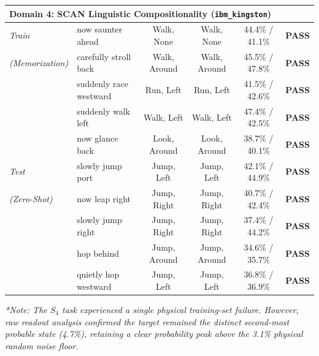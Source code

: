 \documentclass[11pt, a4paper]{article}
\begin{document}
\begin{table}[tb!]
{\begin{tabular}{llcccc}
\midrule
\multicolumn{6}{l}{\textbf{Domain 4: SCAN Linguistic Compositionality (\texttt{ibm\_kingston})}} \\
\midrule
\textit{Train}
& now saunter ahead      & Walk, None   & Walk, None   & 44.4\% / 41.1\% & \textbf{PASS} \\
\textit{(Memorization)} & carefully stroll back  & Walk, Around & Walk, Around & 45.5\% / 47.8\% & \textbf{PASS} \\
& suddenly race westward & Run, Left    & Run, Left    & 41.5\% / 42.6\% & \textbf{PASS} \\
& suddenly walk left     & Walk, Left   & Walk, Left   & 47.4\% / 42.5\% & \textbf{PASS} \\
& now glance back        & Look, Around & Look, Around & 38.7\% / 40.1\% & \textbf{PASS} \\
\midrule
\textit{Test}
& slowly jump port       & Jump, Left   & Jump, Left   & 42.1\% / 44.9\% & \textbf{PASS} \\
\textit{(Zero-Shot)} & now leap right         & Jump, Right  & Jump, Right  & 40.7\% / 42.4\% & \textbf{PASS} \\
& slowly jump right      & Jump, Right  & Jump, Right  & 37.4\% / 44.2\% & \textbf{PASS} \\
& hop behind             & Jump, Around & Jump, Around & 34.6\% / 35.7\% & \textbf{PASS} \\
& quietly hop westward   & Jump, Left   & Jump, Left   & 36.8\% / 36.9\% & \textbf{PASS} \\
\bottomrule
\end{tabular}
}

\vspace{0.15cm}
\parbox{0.97\textwidth}{\scriptsize \textit{*Note: The $S_4$ task experienced a single physical training-set failure. However, raw readout analysis confirmed the target remained the distinct second-most probable state (4.7\%), retaining a clear probability peak above the 3.1\% physical random noise floor.}}
\end{table}
\end{document}
